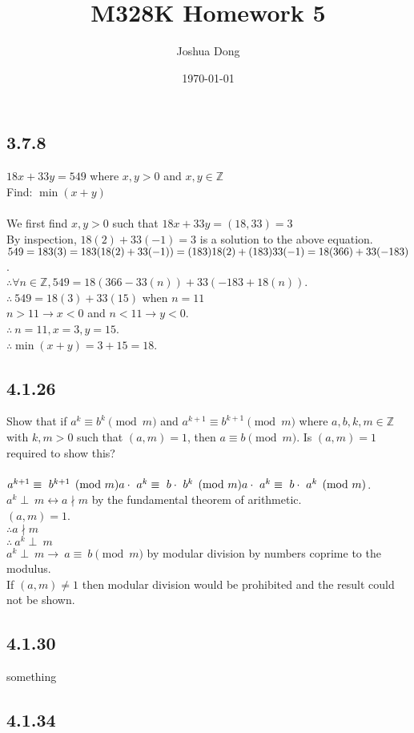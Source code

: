 \documentclass{article}
\begin{document}
\title{M328K\: Homework 5}
\author{Joshua Dong}
\date{\today}
\maketitle

\subsection{3.7.8}
$18x + 33y = 549$ where $x,y > 0$ and $x,y \in \mathbb{Z}$
\\Find: $\min(x+y)$
\\
\\We first find $x, y > 0$ such that $18x + 33y = (18, 33) = 3$
\\By inspection, $18(2)+33(-1)=3$ is a solution to the above equation.
\\$549=183(3)
\\=183(18(2)+33(-1))
\\=(183)18(2) + (183)33(-1)
\\=18(366)+33(-183)$.
\\$\therefore \forall n \in \mathbb{Z}, 549=18(366-33(n))+33(-183+18(n))$.
\\$\therefore\ 549=18(3)+33(15)$ when $n=11$
\\$n>11 \rightarrow x<0$ and $n<11 \rightarrow y<0$.
\\$\therefore\ n=11, x=3, y=15$.
\\$\therefore \min(x+y)=3+15=18$.

\subsection{4.1.26}
Show that if $a^k \equiv b^k \pmod{m}$
and $a^{k+1} \equiv b^{k+1} \pmod{m}$
where $a, b, k, m \in \mathbb{Z}$ with $k,m>0$
such that $(a,m) = 1$,
then $a \equiv b \pmod{m}$.
Is $(a,m) = 1$ required to show this?
\\
\\$a^{k+1} \equiv\ b^{k+1} \pmod{m}
\\a \cdot\ a^k \equiv\ b \cdot\ b^k \pmod{m}
\\a \cdot\ a^k \equiv\ b \cdot\ a^k \pmod{m}$.
\\$a^k \perp\ m \leftrightarrow a \nmid m$ by the fundamental theorem of arithmetic.
\\$(a,m)=1$.
\\$\therefore a \nmid m$
\\$\therefore\ a^k \perp\ m$
\\$a^k \perp\ m \rightarrow\ a \equiv\ b \pmod{m}$ by modular division by numbers coprime to the modulus.
\\If $(a,m)\neq1$ then modular division would be prohibited and the result could not be shown.


\subsection{4.1.30}
something
\subsection{4.1.34}
\end{document}
